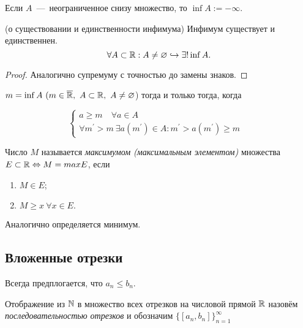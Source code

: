     \begin{definition}
        Если $A$~---~неограниченное снизу множество, то $\inf{A} := -\infty .$
    \end{definition}

    \begin{theorem}{(о существовании и единственности инфимума)} Инфимум существует и единственнен. $$\forall A \subset \mathbb{R}: A \neq \varnothing \hookrightarrow \exists! \inf{A}.$$
    \end{theorem}

    \begin{proof}
        Аналогично супремуму с точностью до замены знаков.
    \end{proof}

    \begin{proposition}
        $m = \inf{A} \text{  } (m \in \overline{\mathbb{R}}, \  A \subset \mathbb{R}, \  A \neq \varnothing$) тогда и только тогда, когда

        \begin{equation*}
            \begin{cases}
                a \geq m \quad \forall a \in A\\
                \forall m^{'} > m \  \exists a(m^{'}) \in A: m^{'} > a(m^{'}) \geq m& 
            \end{cases}
        \end{equation*}
    \end{proposition}

    \begin{definition}
        Число $M$ называется \textit{максимумом (максимальным элементом)} множества $E \subset \mathbb{R} \Leftrightarrow M = max E$, если
        \begin{enumerate}
            \item $M \in E$;
            \item $M \geq x \  \forall x \in E.$
        \end{enumerate}
        Аналогично определяется минимум.
    \end{definition}

    \newpage
    \subsection{Вложенные отрезки}
    Всегда предплогается, что $a_{n} \leq b_{n}.$
    \begin{definition}
        Отображение из $\mathbb{N}$ в множество всех отрезков на числовой прямой $\mathbb{R}$ назовём \textit{последовательностью отрезков} и обозначим $\{ [a_{n}, b_{n}] \}^{\infty}_{n = 1}$
    \end{definition}

